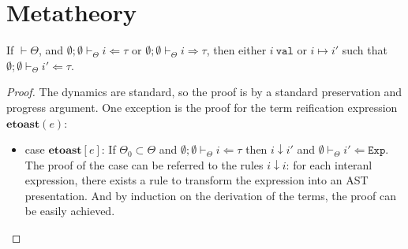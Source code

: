 \documentclass{sig-alternate}
\begin{document}
\section{Metatheory}
\begin{theorem}
If $\vdash\Theta$, and $\emptyset;\emptyset\vdash_{\Theta}i\Leftarrow\tau$ or $\emptyset;\emptyset\vdash_{\Theta}i\Rightarrow\tau$, then either $i~\texttt{val}$ or $i\mapsto i'$ such that $\emptyset;\emptyset\vdash_{\Theta}i'\Leftarrow\tau$.
\end{theorem}
\begin{proof}
The dynamics are standard, so the proof is by a standard preservation and progress argument. One exception is the proof for the term reification expression $\mathbf{etoast}(e)$:
\begin{itemize}
\item {case $\mathbf{etoast}[e]$: If $\Theta_0\subset\Theta$ and $\emptyset;\emptyset\vdash_{\Theta}i\Leftarrow\tau$ then $i\downarrow i'$ and $\emptyset\vdash_{\Theta}i'\Leftarrow\mathtt{Exp}$.}
\\
The proof of the case can be referred to the rules $i\downarrow i$: for each interanl expression, there exists a rule to transform the expression into an AST presentation. And by induction on the derivation of the terms, the proof can be easily achieved.
\end{itemize}
\end{proof}
\end{document}
